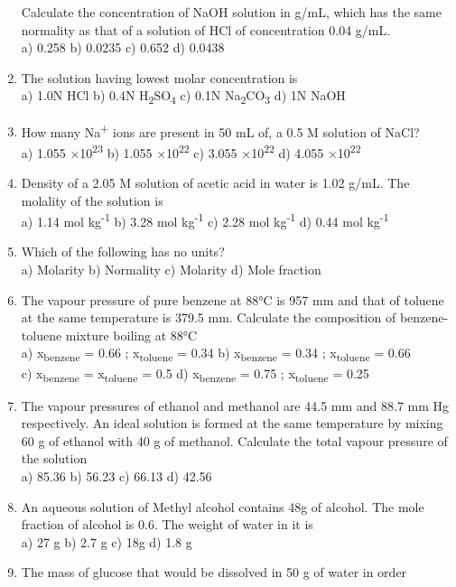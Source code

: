 \begin{enumerate}
  Calculate the concentration of NaOH solution in g/mL, which has the
  same normality as that of a solution of HCl of concentration 0.04
  g/mL.\\
  a) 0.258 b) 0.0235 c) 0.652 d) 0.0438
\item
  The solution having lowest molar concentration is\\
  a) 1.0N HCl b) 0.4N H\textsubscript{2}SO\textsubscript{4} c) 0.1N
  Na\textsubscript{2}CO\textsubscript{3} d) 1N NaOH
\item
  How many Na\textsuperscript{+} ions are present in 50 mL of, a 0.5 M
  solution of NaCl?\\
  a) 1.055 ×10\textsuperscript{23} b) 1.055 ×10\textsuperscript{22} c)
  3.055 ×10\textsuperscript{22} d) 4.055 ×10\textsuperscript{22}
\item
  Density of a 2.05 M solution of acetic acid in water is 1.02 g/mL. The
  molality of the solution is\\
  a) 1.14 mol kg\textsuperscript{-1} b) 3.28 mol kg\textsuperscript{-1}
  c) 2.28 mol kg\textsuperscript{-1} d) 0.44 mol kg\textsuperscript{-1}
\item
  Which of the following has no units?\\
  a) Molarity b) Normality c) Molarity d) Mole fraction
\item
  The vapour pressure of pure benzene at 88°C is 957 mm and that of
  toluene at the same temperature is 379.5 mm. Calculate the composition
  of benzene-toluene mixture boiling at 88°C\\
  a) x\textsubscript{benzene} = 0.66 ; x\textsubscript{toluene} = 0.34
  b) x\textsubscript{benzene} = 0.34 ; x\textsubscript{toluene} = 0.66\\
  c) x\textsubscript{benzene} = x\textsubscript{toluene} = 0.5 d)
  x\textsubscript{benzene} = 0.75 ; x\textsubscript{toluene} = 0.25
\item
  The vapour pressures of ethanol and methanol are 44.5 mm and 88.7 mm
  Hg respectively. An ideal solution is formed at the same temperature
  by mixing 60 g of ethanol with 40 g of methanol. Calculate the total
  vapour pressure of the solution\\
  a) 85.36 b) 56.23 c) 66.13 d) 42.56
\item
  An aqueous solution of Methyl alcohol contains 48g of alcohol. The
  mole fraction of alcohol is 0.6. The weight of water in it is\\
  a) 27 g b) 2.7 g c) 18g d) 1.8 g
\item
  The mass of glucose that would be dissolved in 50 g of water in order

\end{enumerate}
